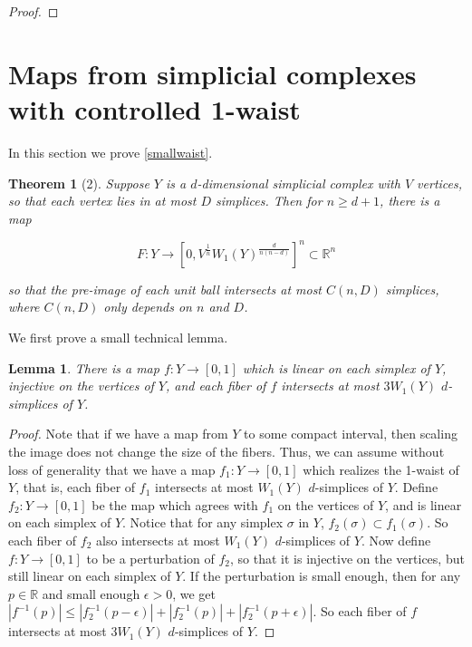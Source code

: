 \documentclass[12pt]{article}
\newtheorem*{theorem*}{Theorem}
\newtheorem{lemma}{Lemma}
\newcommand{\RR}{\mathbb{R}}
\begin{document}
\begin{proof}
	\end{proof}
	
	
	\section*{\centering Maps from simplicial complexes with controlled 1-waist}
	
	In this section we prove \cref{smallwaist}.
	
	\begin{theorem*} [2] Suppose $Y$ is a $d$-dimensional simplicial complex with $V$ vertices, so that each vertex lies in at most $D$ simplices. Then for $n \ge d+1$, there is a map
		
		$$F: Y \to [0, V^{\frac{1}{n}} W_1(Y)^{\frac{d}{n(n-d)}}]^n \subset \RR^n$$
		
		\noindent so that the pre-image of each unit ball intersects at most $C(n, D)$ simplices, where $C(n, D)$ only depends on $n$ and $D$.
	\end{theorem*} 
	
	We first prove a small technical lemma.
	
	\begin{lemma} There is a map $f: Y \to [0,1]$ which is linear on each simplex of $Y$, injective on the vertices of $Y$, and each fiber of $f$ intersects at most $3W_1(Y)$ $d$-simplices of $Y$.
	\end{lemma}
	
	\begin{proof} Note that if we have a map from $Y$ to some compact interval, then scaling the image does not change the size of the fibers. Thus, we can assume without loss of generality that we have a map $f_1: Y \to [0,1]$ which realizes the 1-waist of $Y$, that is, each fiber of $f_1$ intersects at most $W_1(Y)$ $d$-simplices of $Y$. Define $f_2: Y \to [0,1]$ be the map which agrees with $f_1$ on the vertices of $Y$, and is linear on each simplex of $Y$. Notice that for any simplex $\sigma$ in $Y$, $f_2(\sigma) \subset f_1(\sigma)$. So each fiber of $f_2$ also intersects at most $W_1(Y)$ $d$-simplices of $Y$. Now define $f: Y \to [0,1]$ to be a perturbation of $f_2$, so that it is injective on the vertices, but still linear on each simplex of $Y$. If the perturbation is small enough, then for any $p \in \RR$ and small enough $\epsilon >0$, we get $|f^{-1}(p)| \le |f_2^{-1}(p-\epsilon)| + |f_2^{-1}(p)| + |f_2^{-1}(p + \epsilon)|$. So each fiber of $f$ intersects at most $3W_1(Y)$ $d$-simplices of $Y$. 
	\end{proof}
	
\end{document}
